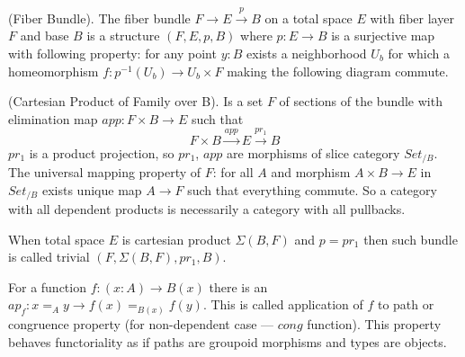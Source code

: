\documentclass{article}
\begin{document}
\begin{definition} (Fiber Bundle).
The fiber bundle $ F \rightarrow E \xrightarrow{p} B$ on a total space $E$ with fiber layer $F$ and base $B$ is a
structure $(F,E,p,B)$ where $p: E \rightarrow B$ is a surjective map with following property:
for any point $y: B$ exists a neighborhood $U_b$ for which a homeomorphism $f: p^{-1}(U_b) \rightarrow U_b \times F$
making the following diagram commute.
\begin{center}
\end{center}
\end{definition}

\begin{definition} (Cartesian Product of Family over B).
Is a set $F$ of sections of the bundle with elimination map $app : F \times B \rightarrow E$ such that
\begin{equation}
F \times B \xrightarrow{app} E \xrightarrow{pr_1} B
\end{equation}
$pr_1$ is a product projection, so $pr_1$, $app$ are morphisms
of slice category $Set_{/B}$. The universal mapping property of $F$:
for all $A$ and morphism $A \times B \rightarrow E$ in $Set_{/B}$ exists
unique map $A \rightarrow F$ such that everything commute. So a category
with all dependent products is necessarily a category with all pullbacks.
\end{definition}

\begin{definition}
When total space $E$ is cartesian product $\Sigma(B,F)$ and $p = pr_1$
then such bundle is called trivial $(F,\Sigma(B,F),pr_1,B)$.
\end{definition}

\begin{theorem}
For a function $f: (x:A) \rightarrow B(x)$
there is an $ap_f : x =_A y \rightarrow f(x) =_{B(x)} f(y)$. This is called
application of $f$ to path or congruence property (for non-dependent case ---
$cong$ function). This property behaves functoriality
as if paths are groupoid morphisms and types are objects.
\end{theorem}
\end{document}
